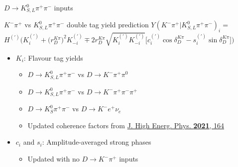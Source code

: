 \documentclass{beamer}
\begin{document}
\begin{frame}{$D\to K_{S, L}^0\pi^+\pi^-$ inputs}
  \begin{block}{$K^-\pi^+$ vs $K_{S, L}^0\pi^+\pi^-$ double tag yield prediction}
    $Y(K^-\pi^+|K_{S, L}^0\pi^+\pi^-)_i =$ \\ 
    $H^{(\prime)}\Big(K_i^{(\prime)} + \big(r_D^{K\pi}\big)^2K_{-i}^{(\prime)} \mp 2r_D^{K\pi}\sqrt{K_i^{(\prime)}K_{-i}^{(\prime)}}\big[c_i^{(\prime)}\cos\delta_D^{K\pi} - s_i^{(\prime)}\sin\delta_D^{K\pi}\big]\Big)$
  \end{block}
  \begin{itemize}
      \setlength\itemsep{1.0em}
    \item{$K_i$: Flavour tag yields}
    \begin{itemize}
      \setlength\itemsep{0.5em}
      \item{$D\to K_{S, L}^0\pi^+\pi^-$ vs $D\to K^-\pi^+\pi^0$}
      \item{$D\to K_{S, L}^0\pi^+\pi^-$ vs $D\to K^-\pi^+\pi^-\pi^+$}
      \item{$D\to K_S^0\pi^+\pi^-$ vs $D\to K^-e^+\nu_e$}
      \item{Updated coherence factors from \href{https://doi.org/10.1007/JHEP05(2021)164}{J. High Energ. Phys. \textbf{2021}, 164}}
    \end{itemize}
    \item{$c_i$ and $s_i$: Amplitude-averaged strong phases}
    \begin{itemize}
      \setlength\itemsep{0.5em}
      \item{Updated with no $D\to K^-\pi^+$ inputs}
    \end{itemize}
  \end{itemize}
\end{frame}
\end{document}
